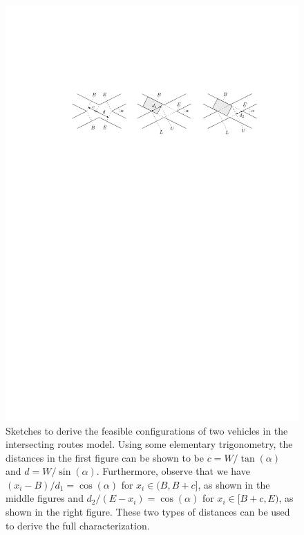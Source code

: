 \documentclass[a4paper]{report}
\theoremstyle{definition}
\theoremstyle{plain}
\newcommand\halfopen[2]{\ensuremath{[#1,#2)}}
\newcommand\openhalf[2]{\ensuremath{(#1,#2]}}
\begin{document}
\begin{figure}
  \centering
  \includegraphics[scale=1]{figures/configuration-space}
  \caption{Sketches to derive the feasible configurations of two vehicles in the
    intersecting routes model. Using some elementary trigonometry, the distances
    in the first figure can be shown to be $c = W / \tan(\alpha)$ and
    $d = W / \sin(\alpha)$. Furthermore, observe that we have
    $(x_{i} - B) / d_{1} = \cos(\alpha)$ for
    $x_{i} \in \openhalf{B}{B + c}$, as shown in the middle figures and
    $d_{2}/(E - x_{i}) = \cos(\alpha)$ for $x_{i} \in \halfopen{B + c}{E}$,
    as shown in the right figure. These two types of distances can be used to
    derive the full characterization.}
  \label{fig:configuration-space}
\end{figure}
\end{document}
